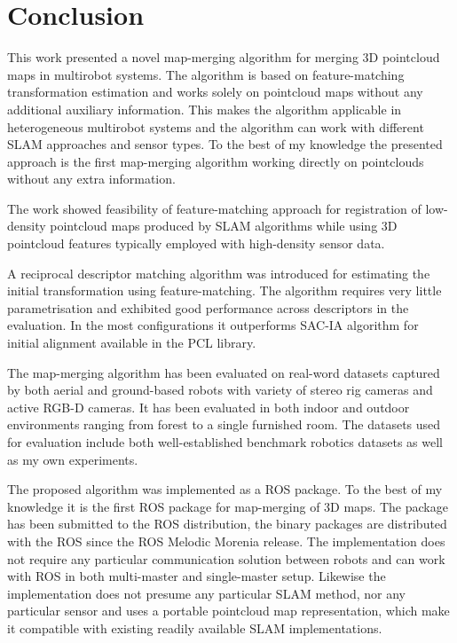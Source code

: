 \chapter*{Conclusion}

This work presented a novel map-merging algorithm for merging \gls{3D} pointcloud maps in multirobot systems. The algorithm is based on feature-matching transformation estimation and works solely on pointcloud maps without any additional auxiliary information. This makes the algorithm applicable in heterogeneous multirobot systems and the algorithm can work with different \gls{SLAM} approaches and sensor types. To the best of my knowledge the presented approach is the first map-merging algorithm working directly on pointclouds without any extra information.

The work showed feasibility of feature-matching approach for registration of low-density pointcloud maps produced by \gls{SLAM} algorithms while using \gls{3D} pointcloud features typically employed with high-density sensor data.

A reciprocal descriptor matching algorithm was introduced for estimating the initial transformation using feature-matching. The algorithm requires very little parametrisation and exhibited good performance across descriptors in the evaluation. In the most configurations it outperforms \gls{SAC-IA} algorithm for initial alignment available in the \gls{PCL} library.

The map-merging algorithm has been evaluated on real-word datasets captured by both aerial and ground-based robots with variety of stereo rig cameras and active \gls{RGB-D} cameras. It has been evaluated in both indoor and outdoor environments ranging from forest to a single furnished room. The datasets used for evaluation include both well-established benchmark robotics datasets as well as my own experiments.

The proposed algorithm was implemented as a \gls{ROS} package. To the best of my knowledge it is the first \gls{ROS} package for map-merging of \gls{3D} maps. The package has been submitted to the \gls{ROS} distribution, the binary packages are distributed with the \gls{ROS} since the \gls{ROS} Melodic Morenia release. The implementation does not require any particular communication solution between robots and can work with \gls{ROS} in both multi-master and single-master setup. Likewise the implementation does not presume any particular \gls{SLAM} method, nor any particular sensor and uses a portable pointcloud map representation, which make it compatible with existing readily available \gls{SLAM} implementations.

